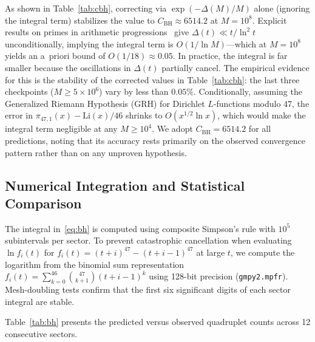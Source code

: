 \documentclass[11pt, a4paper]{article}
\begin{document}
As shown in Table~\ref{tab:cbh}, correcting via $\exp(-\Delta(M)/M)$ alone (ignoring the integral term) stabilizes the value to $C_{\mathrm{BH}} \approx 6514.2$ at $M=10^8$. Explicit results on primes in arithmetic progressions~\cite{ramare-rumely,montgomery-vaughan} give $\Delta(t) \ll t/\ln^2 t$ unconditionally, implying the integral term is $O(1/\ln M)$---which at $M = 10^8$ yields an a~priori bound of $O(1/18) \approx 0.05$. In practice, the integral is far smaller because the oscillations in $\Delta(t)$ partially cancel. The empirical evidence for this is the stability of the corrected values in Table~\ref{tab:cbh}: the last three checkpoints ($M \ge 5 \times 10^{6}$) vary by less than $0.05\%$. Conditionally, assuming the Generalized Riemann Hypothesis (GRH) for Dirichlet $L$-functions modulo 47, the error in $\pi_{47,1}(x) - \mathrm{Li}(x)/46$ shrinks to $O(x^{1/2}\ln x)$, which would make the integral term negligible at any $M \ge 10^{4}$. We adopt $C_{\mathrm{BH}} = 6514.2$ for all predictions, noting that its accuracy rests primarily on the observed convergence pattern rather than on any unproven hypothesis.

\subsection{Numerical Integration and Statistical Comparison}
The integral in~\eqref{eq:bh} is computed using composite Simpson's rule with $10^5$ subintervals per sector. To prevent catastrophic cancellation when evaluating $\ln f_i(t)$ for $f_i(t) = (t+i)^{47} - (t+i-1)^{47}$ at large $t$, we compute the logarithm from the binomial sum representation $f_i(t) = \sum_{k=0}^{46}\binom{47}{k+1}(t+i-1)^k$ using 128-bit precision (\texttt{gmpy2.mpfr}). Mesh-doubling tests confirm that the first six significant digits of each sector integral are stable.

Table~\ref{tab:bh} presents the predicted versus observed quadruplet counts across 12 consecutive sectors.
\end{document}
